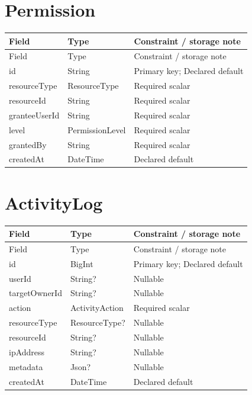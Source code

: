 \section{Permission}
\begin{longtable}{p{.31\linewidth}p{.23\linewidth}p{.36\linewidth}}\toprule Field&Type&Constraint / storage note\\\midrule\endfirsthead\toprule Field&Type&Constraint / storage note\\\midrule\endhead
id&String&Primary key; Declared default\\
resourceType&ResourceType&Required scalar\\
resourceId&String&Required scalar\\
granteeUserId&String&Required scalar\\
level&PermissionLevel&Required scalar\\
grantedBy&String&Required scalar\\
createdAt&DateTime&Declared default\\
\bottomrule\end{longtable}

\section{ActivityLog}
\begin{longtable}{p{.31\linewidth}p{.23\linewidth}p{.36\linewidth}}\toprule Field&Type&Constraint / storage note\\\midrule\endfirsthead\toprule Field&Type&Constraint / storage note\\\midrule\endhead
id&BigInt&Primary key; Declared default\\
userId&String?&Nullable\\
targetOwnerId&String?&Nullable\\
action&ActivityAction&Required scalar\\
resourceType&ResourceType?&Nullable\\
resourceId&String?&Nullable\\
ipAddress&String?&Nullable\\
metadata&Json?&Nullable\\
createdAt&DateTime&Declared default\\
\bottomrule\end{longtable}

